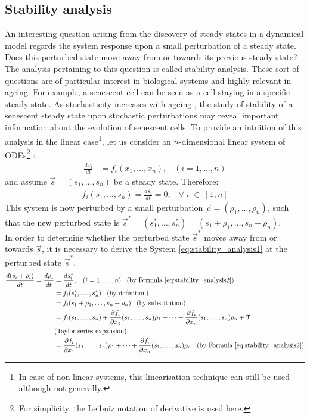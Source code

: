 \subsection{Stability analysis}
\label{subsec:Stability analysis}
An interesting question arising from the discovery of steady states in a dynamical model regards the system response upon a small perturbation of a steady state. Does this perturbed state move away from or towards its previous steady state? The analysis pertaining to this question is called stability analysis. These sort of questions are of particular interest in biological systems \citep{Thomson2009} and highly relevant in ageing. For example, a senescent cell can be seen as a cell staying in a specific steady state. As stochasticity increases with ageing \citep{FinchKirkwood_book2000, Bahar2006, Kirkwood2008}, the study of stability of a senescent steady state upon stochastic perturbations may reveal important information about the evolution of senescent cells. To provide an intuition of this analysis in the linear case\footnote{In case of non-linear systems, this linearisation technique can still be used although not generally.}, let us consider an $n$-dimensional linear system of ODEs\footnote{For 
simplicity, the Leibniz 
notation of derivative is used here.} \citep{Hirsch2004, Parks1992}:
\begin{align}
  \label{eq:stability_analysis1}
  \frac{dx_i}{dt} &= f_i(x_1, \dots, x_n), \;\;\; (i = 1,\dots, n)
\end{align}
and assume $\vec{s} = (s_1, \dots, s_n)$ be a steady state. Therefore:
\begin{align}
  \label{eq:stability_analysis2}
  f_i(s_1, \dots, s_n)=\frac{ds_i}{dt}=0, \;\;\; \forall\; i\; \in\; [1, n]
\end{align}
This system is now perturbed by a small perturbation $\vec{\rho}=(\rho_1, \dots, \rho_n)$, such that the new perturbed state is $\vec{s}^*=(s_1^*, \dots, s_n^*)=(s_1+\rho_1, \dots, s_n+\rho_n)$.\\
In order to determine whether the perturbed state $\vec{s}^*$ moves away from or towards $\vec{s}$, it is necessary to derive the System \ref{eq:stability_analysis1} at the perturbed state $\vec{s}^*$.
\begin{align}
  \label{eq:stability_analysis3}
  \frac{d(s_i + \rho_i)}{dt} = \frac{d\rho_i}{dt} &= \frac{ds_i^*}{dt}, \;\;\; (i = 1,\dots, n) \;\;\; \text{(by Formula \ref{eq:stability_analysis2})} \\
  &= f_i(s_1^*, \dots, s_n^*) \;\;\; \text{(by definition)}  \notag \\
  &= f_i(s_1+\rho_1, \dots, s_n+\rho_n) \;\;\; \text{(by substitution)}  \notag \\
  &= f_i(s_1, \dots, s_n) + \frac{\partial f_i}{\partial x_1}(s_1,\dots,s_n)\rho_1 + \dots +  \frac{\partial f_i}{\partial x_n}(s_1,\dots,s_n)\rho_n + \mathcal{T} \;\;\; \notag \\ 
  & \text{(Taylor series expansion)}  \notag \\
  &= \frac{\partial f_i}{\partial x_1}(s_1,\dots,s_n)\rho_1 + \dots +  \frac{\partial f_i}{\partial x_n}(s_1,\dots,s_n)\rho_n \;\;\; \text{(by Formula \ref{eq:stability_analysis2})}  \notag
\end{align}
